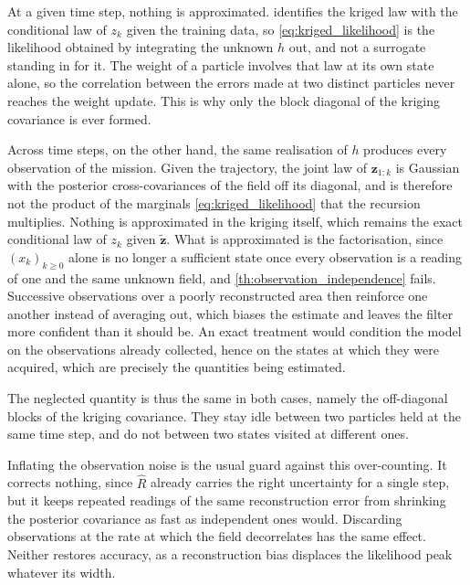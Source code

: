 \begin{remark}\label{th:surrogate_approximation}
	At a given time step, nothing is approximated.  identifies the kriged law with the conditional law of $z_k$ given the training data, so \eqref{eq:kriged_likelihood} is the likelihood obtained by integrating the unknown $h$ out, and not a surrogate standing in for it. The weight of a particle involves that law at its own state alone, so the correlation between the errors made at two distinct particles never reaches the weight update. This is why only the block diagonal of the kriging covariance is ever formed.

	Across time steps, on the other hand, the same realisation of $h$ produces every observation of the mission. Given the trajectory, the joint law of $\mathbf{z}_{1:k}$ is Gaussian with the posterior cross-covariances of the field off its diagonal, and is therefore not the product of the marginals \eqref{eq:kriged_likelihood} that the recursion multiplies. Nothing is approximated in the kriging itself, which remains the exact conditional law of $z_k$ given $\tilde{\mathbf{z}}$. What is approximated is the factorisation, since $(x_k)_{k\geq0}$ alone is no longer a sufficient state once every observation is a reading of one and the same unknown field, and \cref{th:observation_independence} fails. Successive observations over a poorly reconstructed area then reinforce one another instead of averaging out, which biases the estimate and leaves the filter more confident than it should be. An exact treatment would condition the model on the observations already collected, hence on the states at which they were acquired, which are precisely the quantities being estimated.

	The neglected quantity is thus the same in both cases, namely the off-diagonal blocks of the kriging covariance. They stay idle between two particles held at the same time step, and do not between two states visited at different ones.

	Inflating the observation noise is the usual guard against this over-counting. It corrects nothing, since $\hat{R}$ already carries the right uncertainty for a single step, but it keeps repeated readings of the same reconstruction error from shrinking the posterior covariance as fast as independent ones would. Discarding observations at the rate at which the field decorrelates has the same effect. Neither restores accuracy, as a reconstruction bias displaces the likelihood peak whatever its width.
\end{remark}

